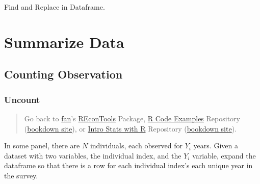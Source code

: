 \documentclass[
]{book}
\newenvironment{Shaded}{\begin{snugshade}}{\end{snugshade}}
\newcommand{\CommentTok}[1]{\textcolor[rgb]{0.56,0.35,0.01}{\textit{#1}}}
\newcommand{\KeywordTok}[1]{\textcolor[rgb]{0.13,0.29,0.53}{\textbf{#1}}}
\newcommand{\NormalTok}[1]{#1}
\newcommand{\OperatorTok}[1]{\textcolor[rgb]{0.81,0.36,0.00}{\textbf{#1}}}
\newcommand{\StringTok}[1]{\textcolor[rgb]{0.31,0.60,0.02}{#1}}
\begin{document}
Find and Replace in Dataframe.

\begin{Shaded}
\end{Shaded}

\hypertarget{summarize-data}{%
\chapter{Summarize Data}\label{summarize-data}}

\hypertarget{counting-observation}{%
\section{Counting Observation}\label{counting-observation}}

\hypertarget{uncount}{%
\subsection{Uncount}\label{uncount}}

\begin{quote}
Go back to \href{http://fanwangecon.github.io/}{fan}'s \href{https://fanwangecon.github.io/REconTools/}{REconTools} Package, \href{https://fanwangecon.github.io/R4Econ/}{R Code Examples} Repository (\href{https://fanwangecon.github.io/R4Econ/bookdown}{bookdown site}), or \href{https://fanwangecon.github.io/Stat4Econ/}{Intro Stats with R} Repository (\href{https://fanwangecon.github.io/Stat4Econ/bookdown}{bookdown site}).
\end{quote}

In some panel, there are \(N\) individuals, each observed for \(Y_i\) years. Given a dataset with two variables, the individual index, and the \(Y_i\) variable, expand the dataframe so that there is a row for each individual index's each unique year in the survey.
\end{document}
